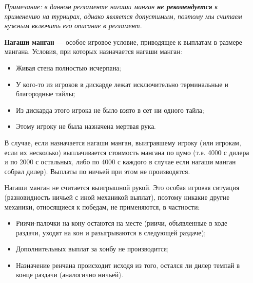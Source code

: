 \begin{additional}
	
\textit{Примечание: в данном регламенте нагаши манган \textbf{не рекомендуется} к применению на турнирах, однако является допустимым, поэтому мы считаем нужным включить его описание в регламент.}

\vspace{0.3cm}

\textbf{Нагаши манган} --- особое игровое условие, приводящее к выплатам в размере мангана. Условия, при которых назначается нагаши манган:

\vspace{0.3cm}

\begin{itemize}
	\item Живая стена полностью исчерпана;
	\item У кого-то из игроков в дискарде лежат исключительно терминальные и благородные тайлы;
	\item Из дискарда этого игрока не было взято в сет ни одного тайла;
	\item Этому игроку не была назначена мертвая рука.
\end{itemize}

\vspace{0.3cm}

В случае, если назначается нагаши манган, выигравшему игроку (или игрокам, если их несколько) выплачивается стоимость мангана по цумо (т.е. 4000 с дилера и по 2000 с остальных, либо по 4000 с каждого в случае если нагаши манган собрал дилер). Выплаты по ничьей при этом не производятся.

\vspace{0.3cm}

Нагаши манган не считается выигрышной рукой. Это особая игровая ситуация (разновидность ничьей с иной механикой выплат), поэтому никакие другие механики, относящиеся к победам, не применяются, в частности:

\vspace{0.3cm}

\begin{itemize}
	\item Риичи-палочки на кону остаются на месте (риичи, объявленные в ходе раздачи, уходят на кон и разыгрываются в следующей раздаче);
	\item Дополнительных выплат за хонбу не производится;
	\item Назначение ренчана происходит исходя из того, остался ли дилер темпай в конце раздачи (аналогично ничьей).
\end{itemize}


\end{additional}
